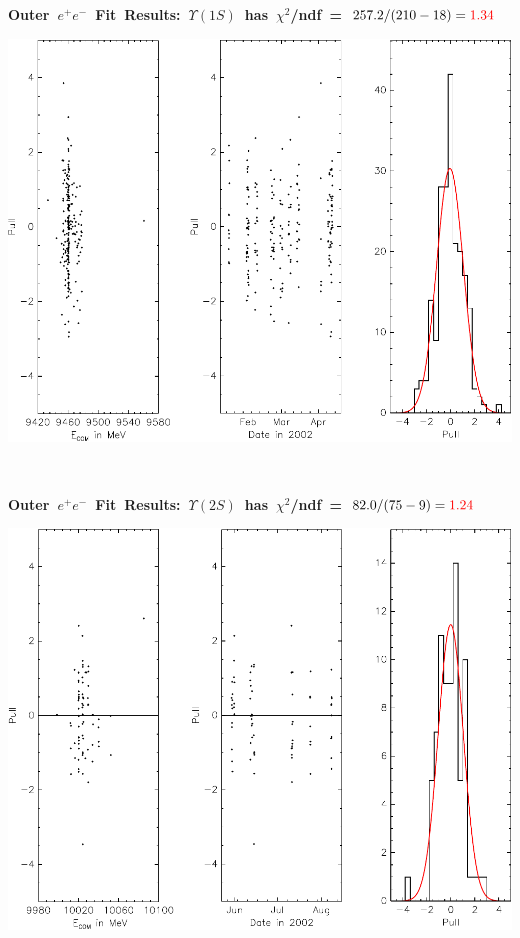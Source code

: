 \documentclass[landscape]{article}
\newenvironment{slide}[1][ ]{\mbox{\boldmath \bf #1 } \vfill}{\vfill \mbox{ } \pagebreak}
\begin{document}
\begin{slide}[Outer $e^+e^-$ Fit Results: $\Upsilon(1S)$ has $\chi^2$/ndf = $257.2/(210-18) = {\color{red} 1.34}$]

\vfill

\vfill
\begin{center}
  \includegraphics[width=0.8\linewidth]{octoberfits_fixen_2_10_pulls1}
\end{center}

\end{slide}

\begin{slide}[Outer $e^+e^-$ Fit Results: $\Upsilon(2S)$ has $\chi^2$/ndf = $82.0/(75-9) = {\color{red} 1.24}$]

\vfill

\vfill
\begin{center}
  \includegraphics[width=0.8\linewidth]{octoberfits_fixen_2_10_pulls2}
\end{center}

\end{slide}
\end{document}

